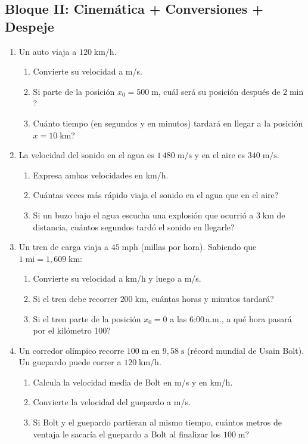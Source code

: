 \documentclass[12pt, letterpaper]{article}
\begin{document}
\subsection{Bloque II: Cinemática + Conversiones + Despeje}

\begin{enumerate}[leftmargin=*, resume]
  \item \medio{} Un auto viaja a $120\;\text{km/h}$.
  \begin{enumerate}[label=\alph*)]
    \item Convierte su velocidad a m/s.
    \item Si parte de la posición $x_0 = 500\;\text{m}$, \textquestiondown cuál será su posición después de $2\;\text{min}$?
    \item \textquestiondown Cuánto tiempo (en segundos y en minutos) tardará en llegar a la posición $x = 10\;\text{km}$?
  \end{enumerate}

  \item \medio{} La velocidad del sonido en el agua es $1\,480\;\text{m/s}$ y en el aire es $340\;\text{m/s}$.
  \begin{enumerate}[label=\alph*)]
    \item Expresa ambas velocidades en km/h.
    \item \textquestiondown Cuántas veces más rápido viaja el sonido en el agua que en el aire?
    \item Si un buzo bajo el agua escucha una explosión que ocurrió a $3\;\text{km}$ de distancia, \textquestiondown cuántos segundos tardó el sonido en llegarle?
  \end{enumerate}

  \item \dificil{} Un tren de carga viaja a $45\;\text{mph}$ (millas por hora). Sabiendo que $1\;\text{mi} = 1{,}609\;\text{km}$:
  \begin{enumerate}[label=\alph*)]
    \item Convierte su velocidad a km/h y luego a m/s.
    \item Si el tren debe recorrer $200\;\text{km}$, \textquestiondown cuántas horas y minutos tardará?
    \item Si el tren parte de la posición $x_0 = 0$ a las 6:00\,a.m., \textquestiondown a qué hora pasará por el kilómetro 100?
  \end{enumerate}

  \item \dificil{} Un corredor olímpico recorre $100\;\text{m}$ en $9{,}58\;\text{s}$ (récord mundial de Usain Bolt). Un guepardo puede correr a $120\;\text{km/h}$.
  \begin{enumerate}[label=\alph*)]
    \item Calcula la velocidad media de Bolt en m/s y en km/h.
    \item Convierte la velocidad del guepardo a m/s.
    \item Si Bolt y el guepardo partieran al mismo tiempo, \textquestiondown cuántos metros de ventaja le sacaría el guepardo a Bolt al finalizar los $100\;\text{m}$?
  \end{enumerate}
\end{enumerate}
\end{document}
